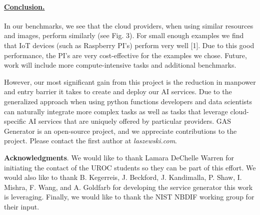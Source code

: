 \paragraph{\underline{Conclusion.}}

In our benchmarks, we see that the cloud providers, when using similar resources and images, perform similarly (see Fig. 3). For small enough examples we find that IoT devices (such as Raspberry PI's) perform very well [1]. Due to this good performance, the PI's are very cost-effective for the examples we chose.
Future, work will include more compute-intensive tasks and additional benchmarks.

However, our most significant gain from this project is the reduction in manpower and entry barrier it takes to create and deploy our AI services. Due to the generalized approach when using python functions developers and data scientists can naturally integrate more complex tasks as well as tasks that leverage cloud-specific AI services that are uniquely offered by particular providers. GAS Generator is an open-source project, and we appreciate contributions to the project. Please contact the first author at  \textit{laszewski\@gmail.com}.


\smallskip
\begin{footnotesize}
{\bf Acknowledgments}. We would like to thank Lamara DeChelle Warren for initiating the contact of the UROC students so they can be part of this effort. 
We would also like to thank
B. Kegerreis,
J. Beckford,
J. Kandimalla,
P. Shaw,
I. Mishra,
F. Wang, and A. Goldfarb for developing the service generator this work is leveraging. Finally, we would like to thank the NIST NBDIF working group for their input.
\end{footnotesize}